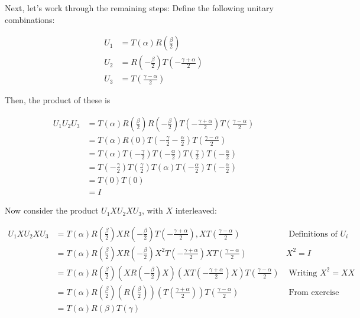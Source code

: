 \documentclass[main.tex]{subfiles}
\begin{document}
    Next, let's work through the remaining steps: Define the following unitary combinations:
    
    $$
    \begin{aligned}
    U_{1} &=T(\alpha) R\left(\frac{\beta}{2}\right) \\
    U_{2} &=R\left(-\frac{\beta}{2}\right) T\left(-\frac{\gamma+\alpha}{2}\right) \\
    U_{3} &=T\left(\frac{\gamma-\alpha}{2}\right)
    \end{aligned}
    $$
    
    Then, the product of these is
    
    $$
    \begin{aligned}
    U_{1} U_{2} U_{3} &=T(\alpha) R\left(\frac{\beta}{2}\right) R\left(-\frac{\beta}{2}\right) T\left(-\frac{\gamma+\alpha}{2}\right) T\left(\frac{\gamma-\alpha}{2}\right) \\
    &=T(\alpha) R(0) T\left(-\frac{\gamma}{2}-\frac{\alpha}{2}\right) T\left(\frac{\gamma-\alpha}{2}\right) \\
    &=T(\alpha) T\left(-\frac{\gamma}{2}\right) T\left(-\frac{\alpha}{2}\right) T\left(\frac{\gamma}{2}\right) T\left(-\frac{\alpha}{2}\right) \\
    &=T\left(-\frac{\gamma}{2}\right) T\left(\frac{\gamma}{2}\right) T(\alpha) T\left(-\frac{\alpha}{2}\right) T\left(-\frac{\alpha}{2}\right) \\
    &=T(0) T(0) \\
    &=I
    \end{aligned}
    $$
    
    Now consider the product $U_{1} X U_{2} X U_{3}$, with $X$ interleaved:
    
    $$
    \begin{array}{rlr}
    U_{1} X U_{2} X U_{3} & =T(\alpha) R\left(\frac{\beta}{2}\right) X R\left(-\frac{\beta}{2}\right) T\left(-\frac{\gamma+\alpha}{2}\right), X T\left(\frac{\gamma-\alpha}{2}\right) & \text { Definitions of } U_{i} \\
    & =T(\alpha) R\left(\frac{\beta}{2}\right) X R\left(-\frac{\beta}{2}\right) X^{2} T\left(-\frac{\gamma+\alpha}{2}\right) X T\left(\frac{\gamma-\alpha}{2}\right) & X^{2}=I \\
    & =T(\alpha) R\left(\frac{\beta}{2}\right)\left(X R\left(-\frac{\beta}{2}\right) X\right)\left(X T\left(-\frac{\gamma+\alpha}{2}\right) X\right) T\left(\frac{\gamma-\alpha}{2}\right) & \text { Writing } X^{2}=X X \\
    & =T(\alpha) R\left(\frac{\beta}{2}\right)\left(R\left(\frac{\beta}{2}\right)\right)\left(T\left(\frac{\gamma+\alpha}{2}\right)\right) T\left(\frac{\gamma-\alpha}{2}\right) & \text { From exercise above } \\
    & =T(\alpha) R(\beta) T(\gamma) &
    \end{array}
    $$
    
\end{document}
